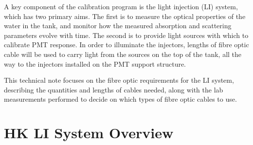\documentclass[a4paper,11pt]{article}
\begin{document}
A key component of the calibration program is the light injection (LI) system, which has two primary aims. The first is to measure the optical properties of the water in the tank, and monitor how the measured absorption and scattering parameters evolve with time. The second is to provide light sources with which to calibrate PMT response. In order to illuminate the injectors, lengths of fibre optic cable will be used to carry light from the sources on the top of the tank, all the way to the injectors installed on the PMT support structure.

This technical note focuses on the fibre optic requirements for the LI system, describing the quantities and lengths of cables needed, along with the lab measurements performed to decide on which types of fibre optic cables to use.

\section{HK LI System Overview}\label{sec:overview}
\end{document}
